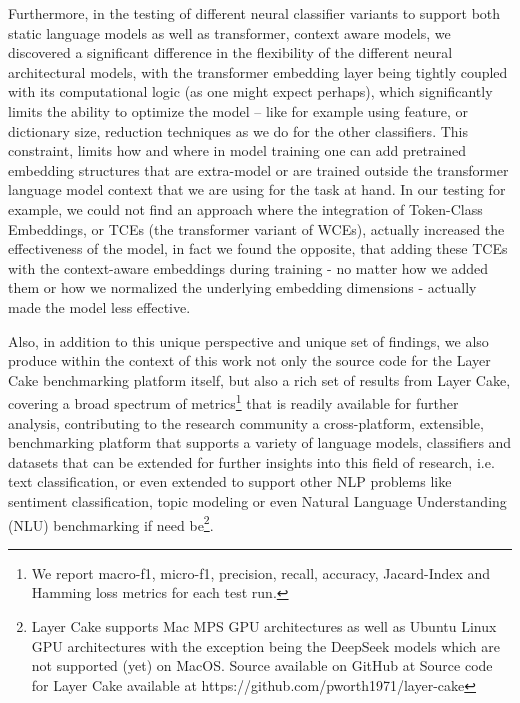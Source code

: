 \documentclass[final]{clv2025}
\begin{document}
Furthermore, in the testing of different neural classifier variants to support both static language models as well as transformer, context aware models, we discovered a significant difference in the flexibility of the different neural architectural models, with the transformer embedding layer being tightly coupled with its computational logic (as one might expect perhaps), which significantly limits the ability to optimize the model – like for example using feature, or dictionary size, reduction techniques as we do for the other classifiers. This constraint, limits how and where in model training one can add pretrained embedding structures that are extra-model or are trained outside the transformer language model context that we are using for the task at hand.  In our testing for example, we could not find an approach where the integration of Token-Class Embeddings, or TCEs (the transformer variant of WCEs), actually increased the effectiveness of the model, in fact we found the opposite, that adding these TCEs with the context-aware embeddings during training - no matter how we added them or how we normalized the underlying embedding dimensions - actually made the model less effective. 

Also, in addition to this unique perspective and unique set of findings, we also produce within the context of this work not only the source code for the Layer Cake benchmarking platform itself, but also a rich set of results from Layer Cake, covering a broad spectrum of metrics\footnote{We report macro-f1, micro-f1, precision, recall, accuracy, Jacard-Index and Hamming loss metrics for each test run.} that is readily available for further analysis, contributing to the research community a cross-platform, extensible, benchmarking platform that supports a variety of language models, classifiers and datasets that can be extended for further insights into this field of research, i.e. text classification, or even extended to support other NLP problems like sentiment classification, topic modeling or even Natural Language Understanding (NLU) benchmarking if need be\footnote{  Layer Cake supports Mac MPS GPU architectures as well as Ubuntu Linux GPU architectures with the exception being the DeepSeek models which are not supported (yet) on MacOS. Source available on GitHub at Source code for Layer Cake available at https://github.com/pworth1971/layer-cake}. 
\end{document}
